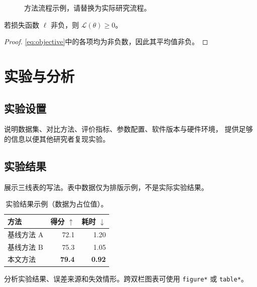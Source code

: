 \documentclass[twocolumn]{paper}
\begin{document}
\begin{figure}[t]
  \centering
  \caption{方法流程示例，请替换为实际研究流程。}
  \label{fig:pipeline}
\end{figure}

\begin{theorem}[示例命题]
若损失函数 $\ell$ 非负，则 $\mathcal{L}(\theta)\geq 0$。
\end{theorem}
\begin{proof}
\cref{eq:objective}中的各项均为非负数，因此其平均值非负。
\end{proof}

\section{实验与分析}
\subsection{实验设置}
说明数据集、对比方法、评价指标、参数配置、软件版本与硬件环境，
提供足够的信息以便其他研究者复现实验。

\subsection{实验结果}
展示三线表的写法。表中数据仅为排版示例，不是实际实验结果。
\begin{table}[t]
  \centering
  \caption{实验结果示例（数据为占位值）。}
  \label{tab:results}
  \begin{tabular}{lrr}
    \toprule
    方法 & 得分 $\uparrow$ & 耗时 $\downarrow$ \\
    \midrule
    基线方法 A & 72.1 & 1.20 \\
    基线方法 B & 75.3 & 1.05 \\
    本文方法 & \textbf{79.4} & \textbf{0.92} \\
    \bottomrule
  \end{tabular}
\end{table}
分析实验结果、误差来源和失效情形。跨双栏图表可使用 \texttt{figure*} 或 \texttt{table*}。
\end{document}
